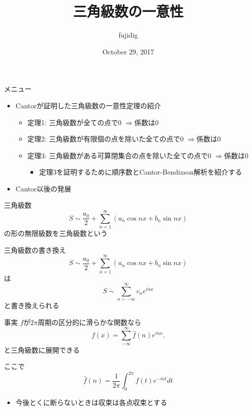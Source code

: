 \documentclass[dvipdfmx,17pt]{beamer}
\title{三角級数の一意性}
\author{fujidig}
\date{October 29, 2017}
\theoremstyle{plain}
\begin{document}
\begin{frame}\frametitle{}
\titlepage
\end{frame}


\begin{frame}{メニュー}
\begin{itemize}

\item Cantorが証明した三角級数の一意性定理の紹介

\begin{itemize}
\item 定理1: 三角級数が全ての点で$0$ $\Rightarrow$係数は$0$
\item 定理2: 三角級数が有限個の点を除いた全ての点で$0$ $\Rightarrow$係数は$0$
\item 定理3: 三角級数がある可算閉集合の点を除いた全ての点で$0$ $\Rightarrow$係数は$0$
\begin{itemize}
	\item 定理3を証明するために順序数とCantor-Bendixson解析を紹介する
\end{itemize}
\end{itemize}

\item Cantor以後の発展

\end{itemize}
\end{frame}


\begin{frame}{三角級数}
\[S \sim \frac{a_0}{2} + \sum_{n=1}^\infty (a_n \cos nx + b_n \sin nx) \]
の形の無限級数を三角級数という
\end{frame}

\begin{frame}{三角級数の書き換え}
\[S \sim \frac{a_0}{2} + \sum_{n=1}^\infty (a_n \cos nx + b_n \sin nx) \]
は
\[S \sim \sum_{n=-\infty}^\infty c_n e^{inx} \]
と書き換えられる
\end{frame}



\begin{frame}{事実}
$f$が$2\pi$周期の区分的に滑らかな関数なら
\[f(x) = \sum_{-\infty}^{\infty} \hat{f}(n)e^{inx}. \]
と三角級数に展開できる

ここで
\[\hat{f}(n) = \frac{1}{2\pi} \int_0^{2\pi} f(t) e^{-int} dt \]
	
{\small
\begin{itemize}
\item 今後とくに断らないときは収束は各点収束とする
\end{itemize}
}
\end{frame}
\end{document}
